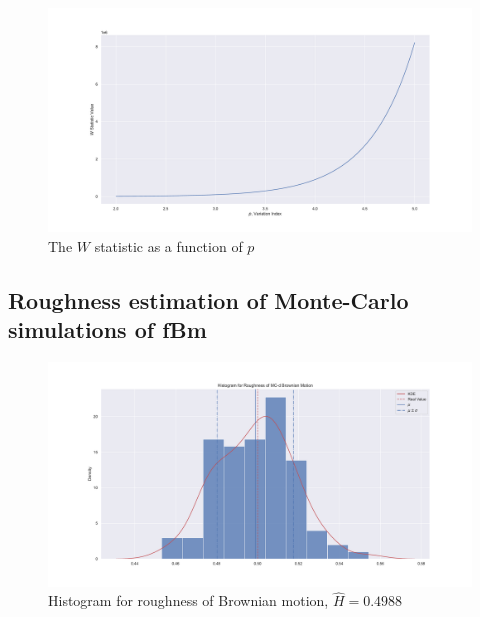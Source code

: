             \begin{frame}{}
                \begin{figure}[htbp]
                    \centering
                    \includegraphics[width=0.9\linewidth]{fig/W Stat Illustration.pdf}
                    \caption{The $W$ statistic as a function of $p$}
                \end{figure}
            \end{frame}

        \subsection{Roughness estimation of Monte-Carlo simulations of fBm}
            \begin{frame}{}
                \begin{figure}[htbp]
                    \centering
                    \includegraphics[width=0.9\linewidth]{fig/Histogram for Roughness of MC-d Brownian Motion.pdf}
                    \caption{Histogram for roughness of Brownian motion, $\hat H = 0.4988$}
                \end{figure}
            \end{frame}

